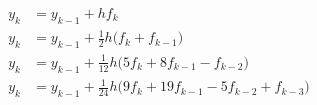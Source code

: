 \begin{align*}
  y_k &= y_{k-1} + h f_k \\
  y_k &= y_{k-1} + \frac12h
        \bigl( f_k + f_{k-1}\bigr)\\
  y_k &= y_{k-1} +
        \frac1{12}h \bigl( 5f_k + 8 f_{k-1} -  f_{k-2}\bigr)\\
  y_k &= y_{k-1} +
        \frac1{24}h \bigl(9f_k+19 f_{k-1}-5 f_{k-2}+ f_{k-3}\bigr)
\end{align*}

